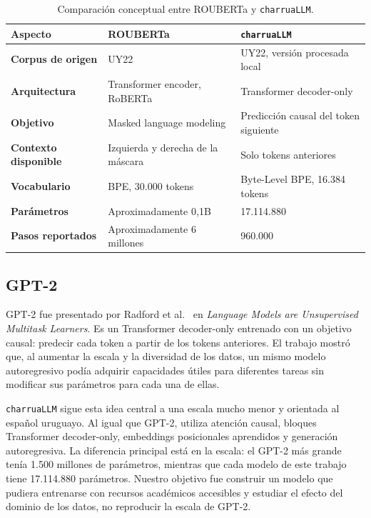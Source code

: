 \documentclass[11pt,a4paper]{article}
\newcommand{\charrua}{\texttt{charruaLLM}}
\begin{document}
\begin{table}[H]
    \centering
    \small
    \caption{Comparación conceptual entre ROUBERTa y \charrua.}
    \label{tab:ROUBERTa-charrua}
    \begin{tabularx}{\textwidth}{>{\bfseries}l X X}
        \toprule
        Aspecto & ROUBERTa & \charrua \\
        \midrule
        Corpus de origen & UY22 & UY22, versión procesada local \\
        Arquitectura & Transformer encoder, RoBERTa & Transformer decoder-only \\
        Objetivo & Masked language modeling & Predicción causal del token siguiente \\
        Contexto disponible & Izquierda y derecha de la máscara & Solo tokens anteriores \\
        Vocabulario & BPE, 30.000 tokens & Byte-Level BPE, 16.384 tokens \\
        Parámetros & Aproximadamente 0,1B & 17.114.880 \\
        Pasos reportados & Aproximadamente 6 millones & 960.000 \\
        \bottomrule
    \end{tabularx}
\end{table}


\subsection{GPT-2}

GPT-2 fue presentado por Radford et al.~\cite{radford2019} en \emph{Language
Models are Unsupervised Multitask Learners}. Es un Transformer decoder-only
entrenado con un objetivo causal: predecir cada token a partir de los tokens
anteriores. El trabajo mostró que, al aumentar la escala y la diversidad de los
datos, un mismo modelo autoregresivo podía adquirir capacidades útiles para
diferentes tareas sin modificar sus parámetros para cada una de ellas.

\charrua{} sigue esta idea central a una escala mucho menor y orientada al
español uruguayo. Al igual que GPT-2, utiliza atención causal, bloques
Transformer decoder-only, embeddings posicionales aprendidos y generación
autoregresiva. La diferencia principal está en la escala: el GPT-2 más grande
tenía 1.500 millones de parámetros, mientras que cada modelo de este trabajo
tiene 17.114.880 parámetros. Nuestro objetivo fue construir un modelo que
pudiera entrenarse con recursos académicos accesibles y estudiar el efecto del
dominio de los datos, no reproducir la escala de GPT-2.
\end{document}
